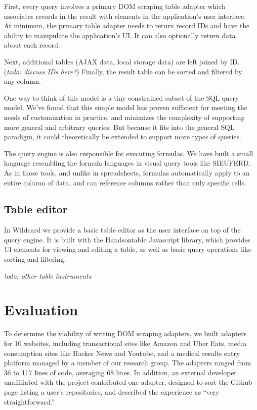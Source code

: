 \documentclass[sigplan,10pt,anonymous,review]{acmart}
\begin{document}
First, every query involves a primary DOM scraping table adapter which
associates records in the result with elements in the application's user
interface. At minimum, the primary table adapter needs to return record
IDs and have the ability to manipulate the application's UI. It can also
optionally return data about each record.

Next, additional tables (AJAX data, local storage data) are left joined
by ID. (\emph{todo: discuss IDs here?}) Finally, the result table can be
sorted and filtered by any column.

One way to think of this model is a tiny constrained subset of the SQL
query model. We've found that this simple model has proven sufficient
for meeting the needs of customization in practice, and minimizes the
complexity of supporting more general and arbitrary queries. But because
it fits into the general SQL paradigm, it could theoretically be
extended to support more types of queries.

The query engine is also responsible for executing formulas. We have
built a small language resembling the formula languages in visual query
tools like SIEUFERD. As in those tools, and unlike in spreadsheets,
formulas automatically apply to an entire column of data, and can
reference columns rather than only specific cells.

\hypertarget{table-editor}{%
\subsection{Table editor}\label{table-editor}}

In Wildcard we provide a basic table editor as the user interface on top
of the query engine. It is built with the Handsontable Javascript
library, which provides UI elements for viewing and editing a table, as
well as basic query operations like sorting and filtering.

\emph{todo: other table instruments}

\hypertarget{sec:evaluation}{%
\section{Evaluation}\label{sec:evaluation}}

To determine the viability of writing DOM scraping adapters, we built
adapters for 10 websites, including transactional sites like Amazon and
Uber Eats, media consumption sites like Hacker News and Youtube, and a
medical results entry platform managed by a member of our research
group. The adapters ranged from 36 to 117 lines of code, averaging 68
lines. In addition, an external developer unaffiliated with the project
contributed one adapter, designed to sort the Github page listing a
user's repositories, and described the experience as ``very
straightforward.''
\end{document}
